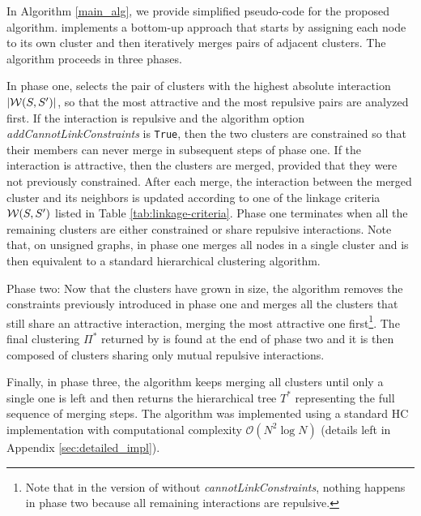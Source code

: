 In Algorithm \ref{main_alg}, we provide simplified pseudo-code for the proposed \algname{} algorithm. \algname{} implements a bottom-up approach that starts by assigning each node to its own cluster and then iteratively merges pairs of adjacent clusters. The algorithm proceeds in three phases. 

In phase one, \algname{} selects the pair of clusters with the highest absolute interaction $|\mathcal{W}(S, S')|$, so that the most attractive and the most repulsive pairs are analyzed first. If the interaction is repulsive and the algorithm option \emph{addCannotLinkConstraints} is \texttt{True}, then the two clusters are constrained so that their members can never merge in subsequent steps of phase one. If the interaction is attractive, then the clusters are merged, provided that they were not previously constrained. 
After each merge, the interaction between the merged cluster and its neighbors is updated according to one of the linkage criteria $\mathcal{W}(S, S')$ listed in Table \ref{tab:linkage-criteria}. Phase one terminates when all the remaining clusters are either constrained or share repulsive interactions. Note that, on unsigned graphs, in phase one \algname{} merges all nodes in a single cluster and is then equivalent to a standard hierarchical clustering algorithm.

Phase two: Now that the clusters have grown in size, the algorithm removes the constraints previously introduced in phase one and merges all the clusters that still share an attractive interaction, merging the most attractive one first\footnote{Note that in the version of \algname{} without \emph{cannotLinkConstraints}, nothing happens in phase two because all remaining interactions are repulsive.}. The final clustering $\Pi^*$ returned by \algname{} is found at the end of phase two and it is then composed of clusters sharing only mutual repulsive interactions. 

Finally, in phase three, the algorithm keeps merging all clusters until only a single one is left and then returns the hierarchical tree $T^*$ representing the full sequence of merging steps.
The algorithm was implemented using a standard HC implementation with computational complexity $\mathcal{O}(N^2 \log N)$ (details left in Appendix \ref{sec:detailed_impl}). 



